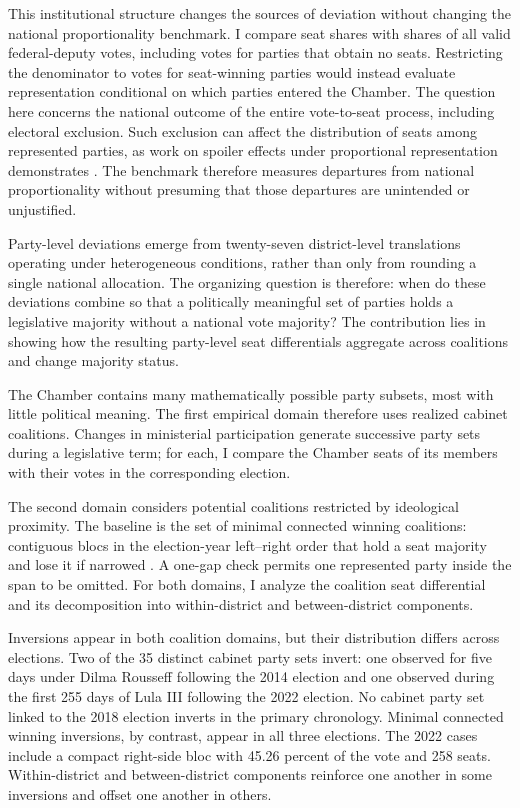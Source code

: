 \documentclass[11pt]{article}
\begin{document}
This institutional structure changes the sources of deviation without changing
the national proportionality benchmark. I compare seat shares with shares of all
valid federal-deputy votes, including votes for parties that obtain no seats.
Restricting the denominator to votes for seat-winning parties would instead
evaluate representation conditional on which parties entered the Chamber. The
question here concerns the national outcome of the entire vote-to-seat process,
including electoral exclusion. Such exclusion can affect the distribution
of seats among represented parties, as work on spoiler effects under
proportional representation demonstrates
\parencite{kaminski18_spoil_effec_propor_repres_system}. The benchmark therefore
measures departures from national proportionality without presuming that those
departures are unintended or unjustified.

Party-level deviations emerge from twenty-seven district-level
translations operating under heterogeneous conditions, rather than only
from rounding a single national allocation. The organizing question is
therefore: when do these deviations combine so that a politically
meaningful set of parties holds a legislative majority without a national
vote majority? The contribution lies in showing how the resulting
party-level seat differentials aggregate across coalitions and change
majority status.

The Chamber contains many mathematically possible party subsets, most with
little political meaning. The first empirical domain therefore uses realized
cabinet coalitions. Changes in ministerial participation generate successive
party sets during a legislative term;
for each, I compare the Chamber seats of its members with their votes in the
corresponding election.

The second domain considers potential coalitions restricted by ideological
proximity. The baseline is the set of minimal connected winning coalitions:
contiguous blocs in the election-year left--right order that hold a seat majority
and lose it if narrowed \parencite{axelrod1970conflict}. A one-gap 
check permits one represented party inside the span to be omitted. For both
domains, I analyze the coalition seat differential and its  decomposition
into within-district and between-district components.

Inversions appear in both coalition domains, but their distribution differs
across elections. Two of the 35 distinct cabinet party sets invert: one observed for five days
under Dilma Rousseff following the 2014 election and one observed during the first 255
days of Lula III following the 2022 election. No cabinet party set linked to
the 2018 election inverts in the primary chronology. Minimal connected
winning inversions, by contrast, appear in all three elections. The 2022
cases include a compact right-side bloc with 45.26 percent of the vote and
258 seats. Within-district and between-district components reinforce one
another in some inversions and offset one another in others.
\end{document}
